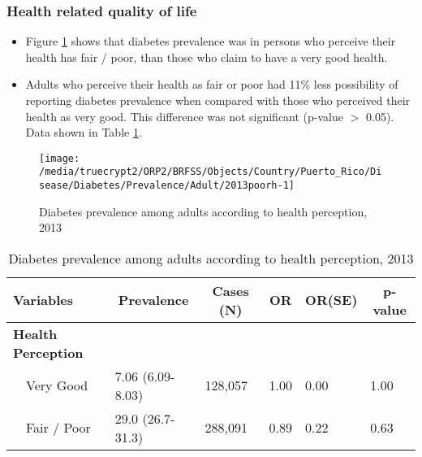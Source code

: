  \newpage
\subsubsection{Health related quality of life}


 \begin{itemize}

\item Figure \ref{fig:fairpoor.Diabetes.2013} shows that diabetes prevalence  was 
 in persons who perceive their health has fair / poor,
than those who claim to have a very good health.

\item Adults who perceive their health as fair or poor had 11\% less possibility of reporting diabetes prevalence when compared with those who perceived their health as very good. This difference was not significant (p-value $>$ 0.05). Data shown in Table \ref{tab:fairpoor.Diabetes.2013}.

\end{itemize}

\begin{figure}[H]
\caption{Diabetes prevalence among adults according to health perception,
         2013}
\label{fig:fairpoor.Diabetes.2013}

\begin{knitrout}
\color{fgcolor}

{\centering \texttt{[image: /media/truecrypt2/ORP2/BRFSS/Objects/Country/Puerto\_Rico/Disease/Diabetes/Prevalence/Adult/2013poorh-1]} 

}



\end{knitrout}
 \end{figure}

\begin{table}[H]
\caption{Diabetes prevalence  among adults according to health perception, 2013\label{tab:fairpoor.Diabetes.2013}} 
\begin{center}
\begin{tabular}{llllll}
\hline\hline
\multicolumn{1}{l}{Variables}&\multicolumn{1}{c}{Prevalence}&\multicolumn{1}{c}{Cases (N)}&\multicolumn{1}{c}{OR}&\multicolumn{1}{c}{OR(SE)}&\multicolumn{1}{c}{p-value}\tabularnewline
\hline
{\bfseries Health Perception}&&&&&\tabularnewline
~~Very Good&7.06 (6.09-8.03)&128,057&1.00&0.00&1.00\tabularnewline
~~Fair / Poor&29.0 (26.7-31.3)&288,091&0.89&0.22&0.63\tabularnewline
\hline
\end{tabular}\end{center}

\end{table}

